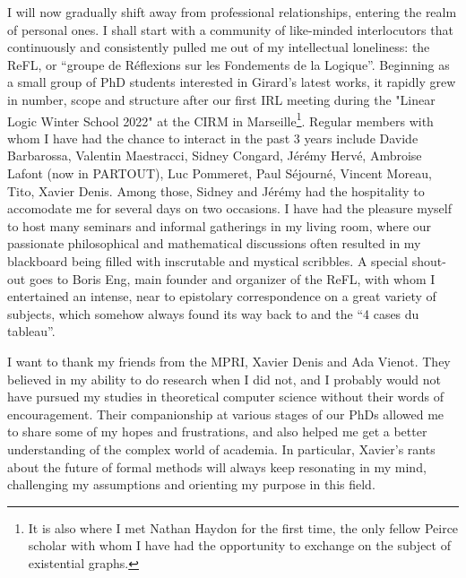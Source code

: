 I will now gradually shift away from professional relationships, entering the realm of personal ones. I shall start with a community of like-minded interlocutors that continuously and consistently pulled me out of my intellectual loneliness: the ReFL, or ``groupe de Réflexions sur les Fondements de la Logique''. Beginning as a small group of PhD students interested in Girard's latest works, it rapidly grew in number, scope and structure after our first IRL meeting during the "Linear Logic Winter School 2022" at the CIRM in Marseille\footnote{It is also where I met Nathan Haydon for the first time, the only fellow Peirce scholar with whom I have had the opportunity to exchange on the subject of existential graphs.}. Regular members with whom I have had the chance to interact in the past 3 years include Davide Barbarossa, Valentin Maestracci, Sidney Congard, Jérémy Hervé, Ambroise Lafont (now in PARTOUT), Luc Pommeret, Paul Séjourné, Vincent Moreau, Tito, Xavier Denis. Among those, Sidney and Jérémy had the hospitality to accomodate me for several days on two occasions. I have had the pleasure myself to host many seminars and informal gatherings in my living room, where our passionate philosophical and mathematical discussions often resulted in my blackboard being filled with inscrutable and mystical scribbles. A special shout-out goes to Boris Eng, main founder and organizer of the ReFL, with whom I entertained an intense, near to epistolary correspondence on a great variety of subjects, which somehow always found its way back to  and the ``4 cases du tableau''.

I want to thank my friends from the MPRI, Xavier Denis and Ada Vienot. They believed in my ability to do research when I did not, and I probably would not have pursued my studies in theoretical computer science without their words of encouragement. Their companionship at various stages of our PhDs allowed me to share some of my hopes and frustrations, and also helped me get a better understanding of the complex world of academia. In particular, Xavier's rants about the future of formal methods will always keep resonating in my mind, challenging my assumptions and orienting my purpose in this field.

